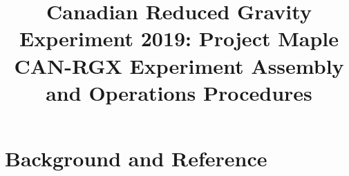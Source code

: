
\usepackage{pdfpages}

\title{
\Huge Canadian Reduced Gravity Experiment 2019: Project Maple\\
\vspace{1cm}
\Large CAN-RGX Experiment Assembly and Operations Procedures}






\section{Background and Reference}


